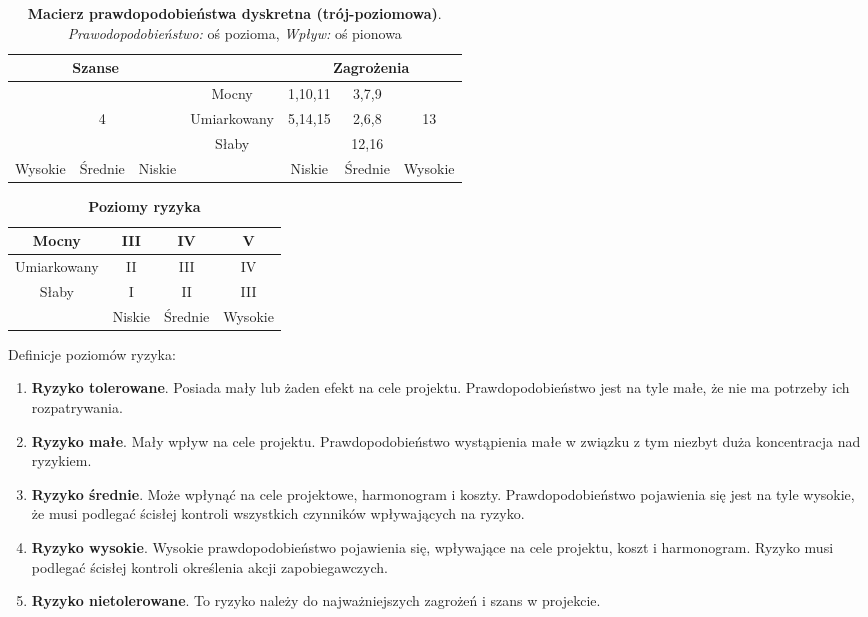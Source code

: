 \begin{table}[htb]
\centering
\begin{tabular}{|c|c|c|c|c|c|c|} 
\multicolumn{3}{|c|}{Szanse} &  & \multicolumn{3}{|c|}{Zagrożenia} \\
\hline  &  &  & Mocny & 1,10,11 & 3,7,9 &  \\
\hline  & 4 &  & Umiarkowany & 5,14,15 & 2,6,8 & 13 \\
\hline  &  &  & Słaby &  & 12,16 &  \\
\hline Wysokie & Średnie & Niskie &  & Niskie & Średnie & Wysokie \\
\end{tabular}
\caption{\textbf{Macierz prawdopodobieństwa dyskretna (trój-poziomowa)}. \mbox{\textit{Prawodopodobieństwo:}} oś pozioma,  \textit{Wpływ:} oś pionowa}
\label{tab:macierzPrawdopodobienstwa}
\end{table}


\begin{table}[htb]
\centering
\begin{tabular}{|c|c|c|c|} 
\hline Mocny & III & IV & V \\
\hline Umiarkowany & II & III & IV \\
\hline Słaby & I & II & III \\
\hline & Niskie & Średnie & Wysokie \\
\end{tabular}
\caption{\textbf{Poziomy ryzyka}}
\label{tab:poziomyRyzyka}
\end{table}


Definicje poziomów ryzyka:
\begin{enumerate}[I]
\item \textbf{Ryzyko tolerowane}. Posiada mały lub żaden efekt na cele projektu. Prawdopodobieństwo jest na tyle małe, że nie ma potrzeby ich rozpatrywania.
\item \textbf{Ryzyko małe}. Mały wpływ na cele projektu. Prawdopodobieństwo wystąpienia małe w
związku z tym niezbyt duża koncentracja nad ryzykiem.
\item \textbf{Ryzyko średnie}. Może wpłynąć na cele projektowe, harmonogram i koszty. Prawdopodobieństwo pojawienia się jest na tyle wysokie, że musi podlegać ścisłej kontroli wszystkich czynników wpływających na ryzyko.
\item \textbf{Ryzyko wysokie}. Wysokie prawdopodobieństwo pojawienia się, wpływające na cele projektu, koszt i harmonogram. Ryzyko musi podlegać ścisłej kontroli określenia akcji zapobiegawczych.
\item \textbf{Ryzyko nietolerowane}. To ryzyko należy do najważniejszych zagrożeń i szans w projekcie.
\end{enumerate}

